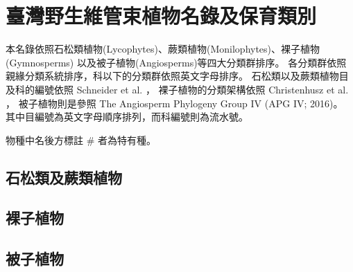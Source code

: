 \chapter{臺灣野生維管束植物名錄及保育類別}

本名錄依照石松類植物(Lycophytes)、蕨類植物(Monilophytes)、裸子植物(Gymnosperms)
以及被子植物(Angiosperms)等四大分類群排序。
各分類群依照親緣分類系統排序，科以下的分類群依照英文字母排序。
石松類以及蕨類植物目及科的編號依照 Schneider et al. \citeyearpar{Schneider:2016hr}，
裸子植物的分類架構依照 Christenhusz et al. \citeyearpar{Christenhusz:2011wm}，
被子植物則是參照 The Angiosperm Phylogeny Group IV (APG IV; 2016)。
其中目編號為英文字母順序排列，而科編號則為流水號。

\noindent 物種中名後方標註 \# 者為特有種。\\
\begin{multicols}{2}
\section{石松類及蕨類植物}

\section{裸子植物}

\section{被子植物}

\end{multicols}
